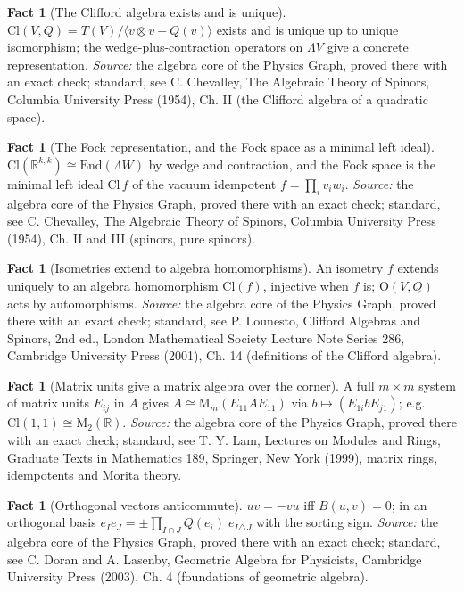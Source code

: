 \documentclass[11pt]{article}
\theoremstyle{definition}
\newtheorem{fact}[theorem]{Fact}
\theoremstyle{plain}
\providecommand{\Cl}{}\renewcommand{\Cl}{\mathrm{Cl}}
\providecommand{\End}{}\renewcommand{\End}{\mathrm{End}}
\providecommand{\Mat}{}\renewcommand{\Mat}{\mathrm{M}}
\providecommand{\R}{}\renewcommand{\R}{\mathbb{R}}
\begin{document}
\begin{fact}[The Clifford algebra exists and is unique]\label{c:std-algebra.existence-uniqueness}
$\Cl(V, Q) = T(V)/\langle v \otimes v - Q(v) \rangle$ exists and is unique up to unique isomorphism; the wedge-plus-contraction operators on $\Lambda V$ give a concrete representation.
\emph{Source:} the algebra core of the Physics Graph, proved there with an exact check; standard, see C. Chevalley, The Algebraic Theory of Spinors, Columbia University Press (1954), Ch. II (the Clifford algebra of a quadratic space).
\end{fact}

\begin{fact}[The Fock representation, and the Fock space as a minimal left ideal]\label{c:std-algebra.fock-representation}
$\Cl(\R^{k,k}) \cong \End(\Lambda W)$ by wedge and contraction, and the Fock space is the minimal left ideal $\Cl\, f$ of the vacuum idempotent $f = \prod_i v_i w_i$.
\emph{Source:} the algebra core of the Physics Graph, proved there with an exact check; standard, see C. Chevalley, The Algebraic Theory of Spinors, Columbia University Press (1954), Ch. II and III (spinors, pure spinors).
\end{fact}

\begin{fact}[Isometries extend to algebra homomorphisms]\label{c:std-algebra.functoriality}
An isometry $f$ extends uniquely to an algebra homomorphism $\Cl(f)$, injective when $f$ is; $\mathrm{O}(V, Q)$ acts by automorphisms.
\emph{Source:} the algebra core of the Physics Graph, proved there with an exact check; standard, see P. Lounesto, Clifford Algebras and Spinors, 2nd ed., London Mathematical Society Lecture Note Series 286, Cambridge University Press (2001), Ch. 14 (definitions of the Clifford algebra).
\end{fact}

\begin{fact}[Matrix units give a matrix algebra over the corner]\label{c:std-algebra.matrix-units}
A full $m \times m$ system of matrix units $E_{ij}$ in $A$ gives $A \cong \Mat_m(E_{11} A E_{11})$ via $b \mapsto (E_{1i} b E_{j1})$; e.g. $\Cl(1,1) \cong \Mat_2(\R)$.
\emph{Source:} the algebra core of the Physics Graph, proved there with an exact check; standard, see T. Y. Lam, Lectures on Modules and Rings, Graduate Texts in Mathematics 189, Springer, New York (1999), matrix rings, idempotents and Morita theory.
\end{fact}

\begin{fact}[Orthogonal vectors anticommute]\label{c:std-algebra.orthogonal-anticommute}
$uv = -vu$ iff $B(u,v) = 0$; in an orthogonal basis $e_I e_J = \pm \prod_{I \cap J} Q(e_i)\; e_{I \triangle J}$ with the sorting sign.
\emph{Source:} the algebra core of the Physics Graph, proved there with an exact check; standard, see C. Doran and A. Lasenby, Geometric Algebra for Physicists, Cambridge University Press (2003), Ch. 4 (foundations of geometric algebra).
\end{fact}
\end{document}
